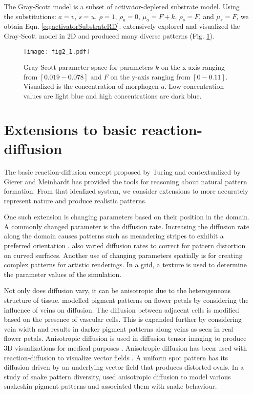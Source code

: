 The Gray-Scott model is a subset of activator-depleted substrate model.	Using the substitutions: $a = v$, $s = u$, $\rho = 1$, $\rho_a = 0$, $\mu_a = F+k$, $\rho_s = F$, and $\mu_s = F$, we obtain Eqn. \ref{eq:activatorSubstrateRD}. \citet{pearson1993} extensively explored and visualized the Gray-Scott model in 2D and produced many diverse patterns (Fig. \ref{fig:grayscottParameterMap}). 

\begin{figure}[H]
	\centering
	\texttt{[image: fig2\_1.pdf]}
	\caption{Gray-Scott parameter space for parameters $k$ on the x-axis ranging from $[0.019 - 0.078]$ and $F$ on the y-axis ranging from $[0 - 0.11]$. Visualized is the concentration of morphogen $a$. Low concentration values are light blue and high concentrations are dark blue.}
	\label{fig:grayscottParameterMap}
\end{figure}

\section{Extensions to basic reaction-diffusion}
The basic reaction-diffusion concept proposed by Turing and contextualized by Gierer and Meinhardt has provided the tools for reasoning about natural pattern formation. From that idealized system, we consider extensions to more accurately represent nature and produce realistic patterns.


One such extension is changing parameters based on their position in the domain. A commonly changed parameter is the diffusion rate. Increasing the diffusion rate along the domain causes patterns such as meandering stripes to exhibit a preferred orientation \citep{zheng2009}. \citet{witkin1991} also varied diffusion rates to correct for pattern distortion on curved surfaces. Another use of changing parameters spatially is for creating complex patterns for artistic renderings. In a grid, a texture is used to determine the parameter values of the simulation. 

Not only does diffusion vary, it can be anisotropic due to the heterogeneous structure of tissue. \citet{zhou2007} modelled pigment patterns on flower petals by considering the influence of veins on diffusion. The diffusion between adjacent cells is modified based on the presence of vascular cells. This is expanded further by considering vein width and results in darker pigment patterns along veins as seen in real flower petals. Anisotropic diffusion is used in diffusion tensor imaging to produce 3D visualizations for medical purposes \citep{bihan2001}. Anisotropic diffusion has been used with reaction-diffusion to visualize vector fields \citep{sanderson2004}. A uniform spot pattern has its diffusion driven by an underlying vector field that produces distorted ovals. In a study of snake pattern diversity, \citet{allen2013} used anisotropic diffusion to model various snakeskin pigment patterns and associated them with snake behaviour.

